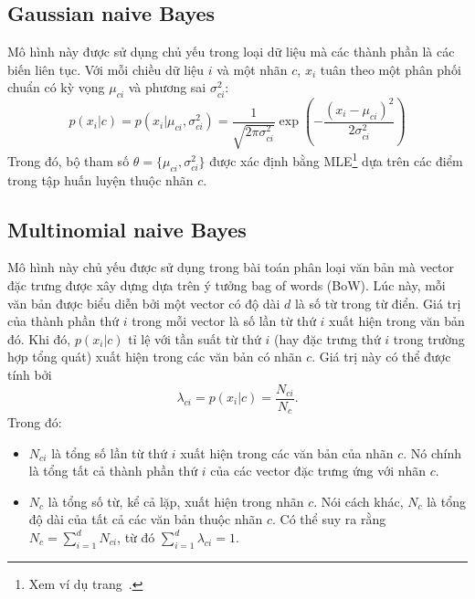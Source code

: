 \subsection{Gaussian naive Bayes }
Mô hình này được sử dụng chủ yếu trong loại dữ liệu mà các thành phần là các
biến liên tục. Với mỗi chiều dữ liệu $i$ và một nhãn $c$, $x_i$ tuân theo một
phân phối chuẩn có kỳ vọng $\mu_{ci}$ và phương sai $\sigma_{ci}^2$:
\begin{equation} 
\label{eqn:32_8}
p(x_i|c) = p(x_i | \mu_{ci}, \sigma_{ci}^2) =  \frac{1}{\sqrt{2\pi \sigma_{ci}^2}} \exp\left(- \frac{(x_i - \mu_{ci})^2}{2 \sigma_{ci}^2}\right)
\end{equation} 
Trong đó, bộ tham số $\theta = \{\mu_{ci}, \sigma_{ci}^2\}$ được xác định bằng
MLE\footnote{Xem ví dụ trang~\pageref{sssec:gassian_mle}.} dựa trên các điểm trong tập huấn luyện thuộc nhãn $c$.
 
 
\subsection{Multinomial naive Bayes }

Mô hình này chủ yếu được sử dụng trong bài toán phân loại văn bản mà vector đặc
trưng được xây dựng dựa trên ý tưởng bag of words (BoW). Lúc này, mỗi văn bản
được biểu diễn bởi một vector có độ dài $d$ là số từ trong từ điển. Giá trị của
thành phần thứ $i$ trong mỗi vector là số lần từ thứ $i$ xuất hiện trong văn bản
đó. Khi đó, $p(x_i |c) $ tỉ lệ với tần suất từ thứ $i$ (hay đặc trưng thứ $i$
trong trường hợp tổng quát) xuất hiện trong các văn bản có nhãn $c$. Giá trị này
có thể được tính bởi
\begin{equation} 
\label{eqn:32_10}
\lambda_{ci} = p(x_i | c) = \frac{N_{ci}}{N_c}.
\end{equation} 
Trong đó: 
\begin{itemize}
    \item $N_{ci}$ là tổng số lần từ thứ $i$ xuất hiện trong các văn bản của
    nhãn $c$. Nó chính là tổng tất cả thành phần thứ $i$ của các
    vector đặc trưng ứng với nhãn $c$.
    
    \item $N_c$ là tổng số từ, kể cả lặp, xuất hiện trong nhãn $c$. Nói cách
    khác, $N_c$ là tổng độ dài của tất cả các văn bản thuộc nhãn $c$. Có
    thể suy ra rằng $N_c = \sum_{i = 1}^d N_{ci}$, từ đó $\sum_{i=1}^d
    \lambda_{ci} = 1$. 
\end{itemize}
 
